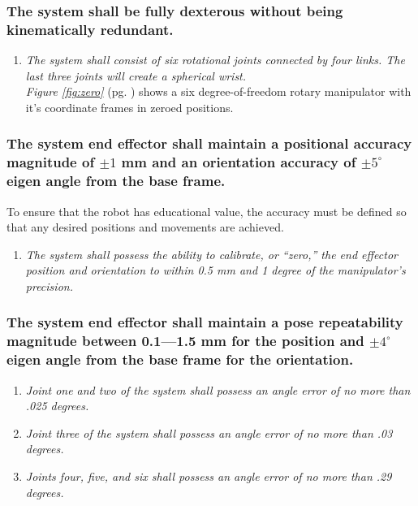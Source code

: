 \documentclass[12pt]{report}
\begin{document}
\subsubsection{The system shall be fully dexterous without being kinematically redundant.}
\begin{enumerate}[label=\thesubsubsection.\alph*,leftmargin=3cm,font=\itshape]
\item \textit{The system shall consist of six rotational joints connected by four links. The last three joints will create a spherical wrist.} \\
\emph{Figure \ref{fig:zero}} (pg. \pageref{fig:zero}) shows a six degree-of-freedom rotary manipulator with it's coordinate frames in zeroed positions.
\end{enumerate}

\subsubsection{The system end effector shall maintain a positional accuracy magnitude of \(\pm 1\) mm and an orientation accuracy of \(\pm 5^{\circ}\) eigen angle from the base frame.}
To ensure that the robot has educational value, the accuracy must be defined so that any desired positions and movements are achieved.
\begin{enumerate}[label=\thesubsubsection.\alph*,leftmargin=3cm,font=\itshape]
  \item \textit{The system shall possess the ability to calibrate, or “zero,” the end effector position and orientation to within 0.5 mm and 1 degree of the manipulator’s precision. }
\end{enumerate}
\subsubsection{The system end effector shall maintain a pose repeatability magnitude between 0.1—1.5 mm for the position and \(\pm 4^{\circ}\) eigen angle from the base frame for the orientation.}
\begin{enumerate}[label=\thesubsubsection.\alph*,leftmargin=3cm,font=\itshape]
  \item \textit{Joint one and two of the system shall possess an angle error of no more than .025 degrees.}
  \item \textit{Joint three of the system shall possess an angle error of no more than .03 degrees.}
  \item \textit{Joints four, five, and six shall possess an angle error of no more than .29 degrees.}
\end{enumerate}
\end{document}
